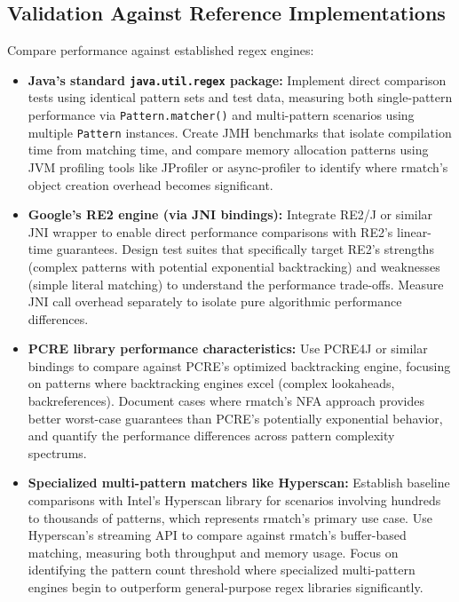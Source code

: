 \documentclass[11pt,a4paper]{article}
\begin{document}
\subsection{Validation Against Reference Implementations}

Compare performance against established regex engines:
\begin{itemize}
\item \textbf{Java's standard \texttt{java.util.regex} package:} Implement direct comparison tests using identical pattern sets and test data, measuring both single-pattern performance via \texttt{Pattern.matcher()} and multi-pattern scenarios using multiple \texttt{Pattern} instances. Create JMH benchmarks that isolate compilation time from matching time, and compare memory allocation patterns using JVM profiling tools like JProfiler or async-profiler to identify where rmatch's object creation overhead becomes significant.

\item \textbf{Google's RE2 engine (via JNI bindings):} Integrate RE2/J or similar JNI wrapper to enable direct performance comparisons with RE2's linear-time guarantees. Design test suites that specifically target RE2's strengths (complex patterns with potential exponential backtracking) and weaknesses (simple literal matching) to understand the performance trade-offs. Measure JNI call overhead separately to isolate pure algorithmic performance differences.

\item \textbf{PCRE library performance characteristics:} Use PCRE4J or similar bindings to compare against PCRE's optimized backtracking engine, focusing on patterns where backtracking engines excel (complex lookaheads, backreferences). Document cases where rmatch's NFA approach provides better worst-case guarantees than PCRE's potentially exponential behavior, and quantify the performance differences across pattern complexity spectrums.

\item \textbf{Specialized multi-pattern matchers like Hyperscan:} Establish baseline comparisons with Intel's Hyperscan library for scenarios involving hundreds to thousands of patterns, which represents rmatch's primary use case. Use Hyperscan's streaming API to compare against rmatch's buffer-based matching, measuring both throughput and memory usage. Focus on identifying the pattern count threshold where specialized multi-pattern engines begin to outperform general-purpose regex libraries significantly.
\end{itemize}
\end{document}
